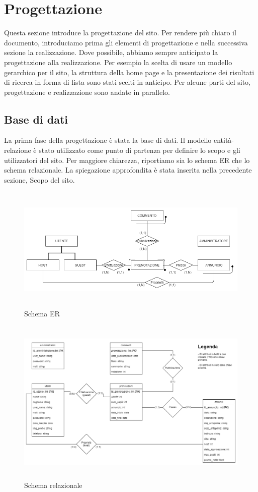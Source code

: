 \documentclass[1_relazione.tex]{subfiles}
\begin{document}
\section{Progettazione}
Questa sezione introduce la progettazione del sito. Per rendere pi\`{u} chiaro il documento, introduciamo prima gli elementi di progettazione e nella successiva sezione la realizzazione. Dove possibile, abbiamo sempre anticipato la progettazione alla realizzazione. Per esempio la scelta di usare un modello gerarchico per il sito, la struttura della home page e la presentazione dei risultati di ricerca in forma di lista sono stati scelti in anticipo. Per alcune parti del sito, progettazione e realizzazione sono andate in parallelo.

\subsection{Base di dati}
La prima fase della progettazione \`{e} stata la base di dati.  Il modello entit\`{a}-relazione \`{e} stato utilizzato come punto di partenza per definire lo scopo e gli utilizzatori del sito. Per maggiore chiarezza, riportiamo sia lo schema ER che lo schema relazionale. La spiegazione approfondita \`{e} stata inserita nella precedente sezione, Scopo del sito.

\begin{figure}[h]
\centering
\includegraphics[width=14cm, height=6cm]{immagini/schema_ER-2}
\caption{Schema ER }
\end{figure}

\begin{figure}[h]
\centering
\includegraphics[width=14cm, height=8cm]{immagini/schema_relazionale-2}
\caption{Schema relazionale }
\end{figure}
\end{document}
